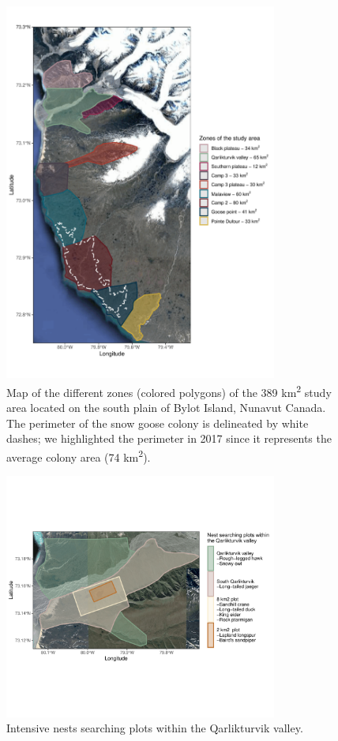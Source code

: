 \documentclass[a4paper,twoside,12pt]{article}
\begin{document}
\begin{figure}
\centering
  \includegraphics[width=0.8\textwidth, angle=0]{figures/zones_study_area.pdf}
   \caption{Map of the different zones (colored polygons) of the 389 km\textsuperscript{2} study area located on the south plain of Bylot Island, Nunavut Canada. The perimeter of the snow goose colony is delineated by white dashes; we highlighted the perimeter in 2017 since it represents the average colony area (74 km\textsuperscript{2}).}
  \label{figure:zones}
\end{figure}
\begin{figure}
\centering
  \includegraphics[width=0.8\textwidth, angle=0]{figures/qarlikturvik_valley.pdf}
  \vspace{-70pt} %
  \caption{Intensive nests searching plots within the Qarlikturvik valley.}
 \label{figure:qarlikturvik_valley}
\end{figure}
\newpage
\end{document}
